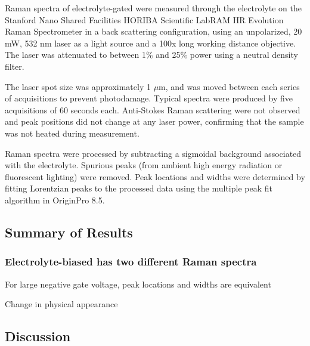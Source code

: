 Raman spectra of electrolyte-gated \rucl were measured through the electrolyte on the Stanford Nano Shared Facilities HORIBA Scientific LabRAM HR Evolution Raman Spectrometer in a back scattering configuration, using an unpolarized, 20 mW, 532 nm laser as a light source and a 100x long working distance objective. The laser was attenuated to between 1\% and 25\% power using a neutral density filter.

The laser spot size was approximately 1 $\mu$m, and was moved between each series of acquisitions to prevent photodamage. Typical spectra were produced by five acquisitions of 60 seconds each. Anti-Stokes Raman scattering were not observed and peak positions did not change at any laser power, confirming that the sample was not heated during measurement.

Raman spectra were processed by subtracting a sigmoidal background associated with the electrolyte. Spurious peaks (from ambient high energy radiation or fluorescent lighting) were removed. Peak locations and widths were determined by fitting Lorentzian peaks to the processed data using the multiple peak fit algorithm in OriginPro 8.5.

\subsection{Summary of Results}

\subsubsection{Electrolyte-biased \rucl has two different Raman spectra}



For large negative gate voltage, peak locations and widths are equivalent

Change in physical appearance





\subsection{Discussion}